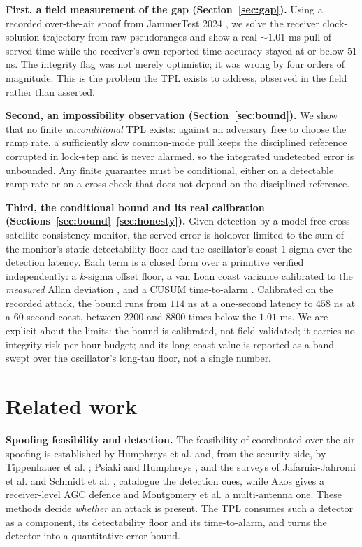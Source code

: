 \documentclass[conference]{IEEEtran}
\begin{document}
\textbf{First, a field measurement of the gap (Section~\ref{sec:gap}).} Using a
recorded over-the-air spoof from JammerTest 2024 \cite{jammertest}, we solve the
receiver clock-solution trajectory from raw pseudoranges and show a real
$\sim$$1.01$ ms pull of served time while the receiver's own reported time
accuracy stayed at or below $51$ ns. The integrity flag was not merely optimistic;
it was wrong by four orders of magnitude. This is the problem the TPL exists to
address, observed in the field rather than asserted.

\textbf{Second, an impossibility observation (Section~\ref{sec:bound}).} We show
that no finite \emph{unconditional} TPL exists: against an adversary free to choose
the ramp rate, a sufficiently slow common-mode pull keeps the disciplined
reference corrupted in lock-step and is never alarmed, so the integrated undetected
error is unbounded. Any finite guarantee must be conditional, either on a
detectable ramp rate or on a cross-check that does not depend on the disciplined
reference.

\textbf{Third, the conditional bound and its real calibration
(Sections~\ref{sec:bound}--\ref{sec:honesty}).} Given detection by a model-free
cross-satellite consistency monitor, the served error is holdover-limited to the
sum of the monitor's static detectability floor and the oscillator's coast
1-sigma over the detection latency. Each term is a closed form over a primitive
verified independently: a $k$-sigma offset floor, a van Loan coast variance
calibrated to the \emph{measured} Allan deviation \cite{riley,vanloan}, and a
CUSUM time-to-alarm \cite{page}. Calibrated on the recorded attack, the bound runs
from $114$ ns at a one-second latency to $458$ ns at a $60$-second coast, between
$2200$ and $8800$ times below the $1.01$ ms. We are explicit about the limits:
the bound is calibrated, not field-validated; it carries no
integrity-risk-per-hour budget; and its long-coast value is reported as a band
swept over the oscillator's long-tau floor, not a single number.

\section{Related work}
\textbf{Spoofing feasibility and detection.} The feasibility of coordinated
over-the-air spoofing is established by Humphreys et al. \cite{humphreys} and, from
the security side, by Tippenhauer et al. \cite{tippenhauer}; Psiaki and Humphreys
\cite{psiaki}, and the surveys of Jafarnia-Jahromi et al. \cite{jafarnia} and
Schmidt et al. \cite{schmidt}, catalogue the detection cues, while Akos
\cite{akos} gives a receiver-level AGC defence and Montgomery et al.
\cite{montgomery} a multi-antenna one. These methods decide
\emph{whether} an attack is present. The TPL consumes such a detector as a
component, its detectability floor and its time-to-alarm, and turns the detector
into a quantitative error bound.
\end{document}
